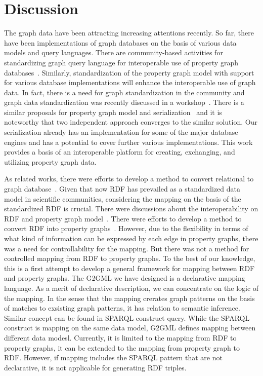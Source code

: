 \documentclass[runningheads]{llncs}
\begin{document}
\section{Discussion}
The graph data have been attracting increasing attentions recently. 
So far, there have been implementations of graph databases on the basis of various data models and query languages. 
There are community-based activities for standardizing graph query language for interoperable use of property graph databases~\cite{angles3}. Similarly, standardization of the property graph model with support for various database implementations will enhance the interoperable use of graph data. In fact, there is a need for graph standardization in the community and graph data standardization was recently discussed in a workshop~\cite{w3c}. There is a similar proposals for property graph model and serialization~\cite{tomaszuk} and it is noteworthy that two independent approach converges to the similar solution. Our serialization already has an implementation for some of the major database engines and has a potential to cover further various implementations. %
This work provides a basis of an interoperable platform for creating, exchanging, and utilizing property graph data.

As related works, there were efforts to develop a method to convert relational to graph database~\cite{virgilio1}. Given that now RDF has prevailed as a standardized data model in scientific communities, considering the mapping on the basis of the standardized RDF is crucial. There were discussions about the interoperability on RDF and property graph model~\cite{hartig,das,thakkar}. There were efforts to develop a method to convert RDF into property graphs~\cite{tomaszuk1,virgilio}. However, due to the flexibility in terms of what kind of information can be expressed by each edge in property graphs, there was a need for controllability for the mapping. But there was not a method for controlled mapping from RDF to property graphs.
To the best of our knowledge, this is a first attempt to develop a general framework for mapping between RDF and property graphs. The G2GML we have designed is a declarative mapping language. As a merit of declarative description, we can concentrate on the logic of the mapping. In the sense that the mapping crerates graph patterns on the basis of matches to exsisting graph patterns, it has relation to semantic inference. Similar concept can be found in SPARQL construct query. While the SPARQL construct is mapping on the same data model, G2GML defines mapping between different data modesl. Currently, it is limited to the mapping from RDF to property graphs, it can be extended to the mapping from property graph to RDF. However, if mapping includes the SPARQL pattern that are not declarative, it is not applicable for generating RDF triples.
\end{document}
